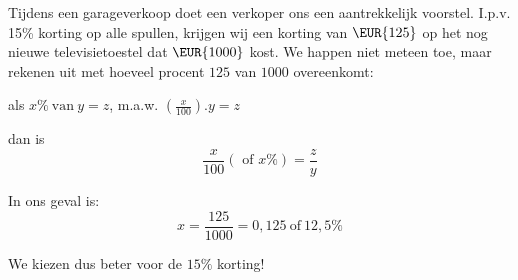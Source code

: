 \begin{voorbeeld}
Tijdens een garageverkoop doet een verkoper ons een aantrekkelijk
voorstel. I.p.v. 15\% korting op alle spullen, krijgen wij een korting
van $\text{\EUR{125}}$ op het nog nieuwe televisietoestel dat $\text{\EUR{1000}}$
kost. We happen niet meteen toe, maar rekenen uit met hoeveel procent
$125$ van $1000$ overeenkomt:

als $x\%\:\mathrm{van}\:y=z$, m.a.w. ${\displaystyle \left(\frac{x}{100}\right).y=z}$

dan is 
\begin{equation*}
\frac{x}{100} (\text{ of } x\%) = \frac{z}{y}
\end{equation*}

In ons geval is: 
\begin{equation*}
x=\frac{125}{1000}=0,125\:\mathrm{of}\:12,5\%
\end{equation*}

We kiezen dus beter voor de $15\%$ korting!
\end{voorbeeld}
